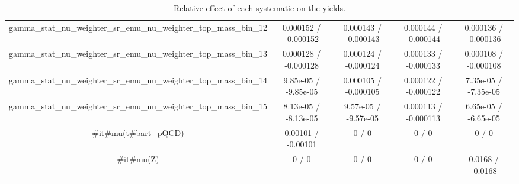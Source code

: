 \documentclass[10pt]{article}
\begin{document}
\begin{table}[htbp]
\begin{center}
\begin{tabular}{|c|c|c|c|c|}
  gamma_stat_nu_weighter_sr_emu_nu_weighter_top_mass_bin_12 & 0.000152 / -0.000152 & 0.000143 / -0.000143 & 0.000144 / -0.000144 & 0.000136 / -0.000136 \\ 
  gamma_stat_nu_weighter_sr_emu_nu_weighter_top_mass_bin_13 & 0.000128 / -0.000128 & 0.000124 / -0.000124 & 0.000133 / -0.000133 & 0.000108 / -0.000108 \\ 
  gamma_stat_nu_weighter_sr_emu_nu_weighter_top_mass_bin_14 & 9.85e-05 / -9.85e-05 & 0.000105 / -0.000105 & 0.000122 / -0.000122 & 7.35e-05 / -7.35e-05 \\ 
  gamma_stat_nu_weighter_sr_emu_nu_weighter_top_mass_bin_15 & 8.13e-05 / -8.13e-05 & 9.57e-05 / -9.57e-05 & 0.000113 / -0.000113 & 6.65e-05 / -6.65e-05 \\ 
  #it{#mu}(t#bar{t}_{pQCD}) & 0.00101 / -0.00101 & 0 / 0 & 0 / 0 & 0 / 0 \\ 
  #it{#mu}(Z) & 0 / 0 & 0 / 0 & 0 / 0 & 0.0168 / -0.0168 \\ 
\hline 
\end{tabular} 
\caption{Relative effect of each systematic on the yields.} 
\end{center} 
\end{table} 
\end{document}
